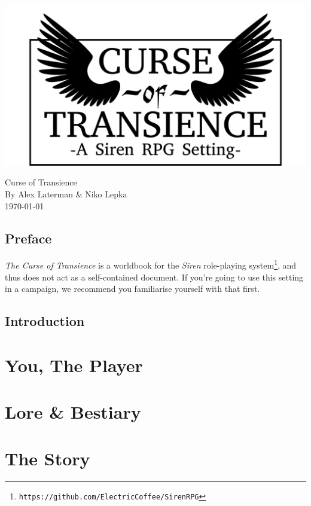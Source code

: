 \documentclass[a4paper]{book}
\begin{document}
\begin{titlepage}
    \begin{center}
        \includegraphics[width = \textwidth]{graphics/logo-winged.png}
    \end{center}
\end{titlepage}
\thispagestyle{empty}
\frontmatter
\begin{center}
    \Huge{Curse of Transience}\\
    \Large{By Alex Laterman \& Niko Lepka}\\
    \large{\today}
\end{center}

\chapter*{Preface}
\textit{The Curse of Transience} is a worldbook for the \textit{Siren} role-playing system\footnote{\texttt{https://github.com/ElectricCoffee/SirenRPG}}, and thus does not act as a self-contained document.
If you're going to use this setting in a campaign, we recommend you familiarise yourself with that first.

\chapter*{Introduction}

\tableofcontents
\mainmatter
\part{You, The Player}










\part{Lore \& Bestiary}



\part{The Story}
\end{document}
